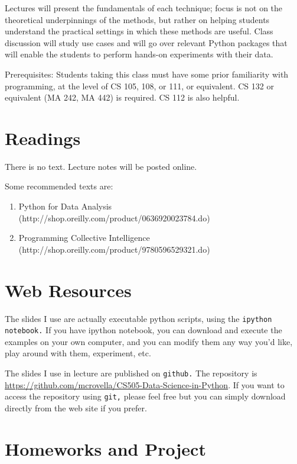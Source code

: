 \documentclass[11pt]{article}
\begin{document}
Lectures will present the fundamentals of each technique; focus is not
on the theoretical underpinnings of the methods, but rather on helping
students understand the practical settings in which these methods are
useful.  Class discussion will study use cases and will go over relevant
Python packages that will enable the students to perform hands-on
experiments with their data. 

Prerequisites: Students taking this class must have some prior familiarity with
programming, at the level of CS 105, 108, or 111, or equivalent.   CS
132 or equivalent (MA 242, MA 442) is required.  CS 112 is also helpful.

\section*{Readings} 

There is no text.   Lecture notes will be posted online.

Some recommended texts are:
\begin{enumerate}
\item Python for Data Analysis
  (http://shop.oreilly.com/product/0636920023784.do)
\item Programming Collective Intelligence (http://shop.oreilly.com/product/9780596529321.do)
\end{enumerate}

\section*{Web Resources} 

The slides I use are actually executable python scripts, using the
\texttt{ipython notebook.}   If you have ipython notebook, you can
download and execute the examples on your own computer, and you can
modify them any way you'd like, play around with them, experiment, etc.

The slides I use in lecture are published on \texttt{github.}   The
repository is
\url{https://github.com/mcrovella/CS505-Data-Science-in-Python}.  If you want
to access the repository using \texttt{git,} please feel free but you
can simply download directly from the web site if you prefer.
 
\section*{Homeworks and Project}
\end{document}
